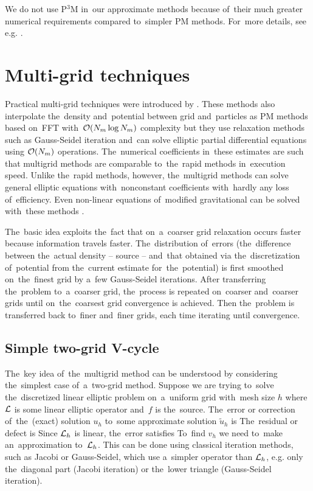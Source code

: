 We do not use P$^3$M in~our approximate methods because of~their much greater numerical requirements compared to~simpler PM methods. For~more details, see e.g. \textcite{Hockney:1988:CSU:62815}.
\section{Multi-grid techniques}
Practical multi-grid techniques were introduced by \textcite{10.2307/2006422}. These methods also interpolate the~density and~potential between grid and~particles as PM methods based on~FFT with~$\mathcal{O}(N_m\log N_m)$ complexity but they use relaxation methods such as Gauss-Seidel iteration \parencite{doi:10.1002/zamm.19720520813} and~can solve elliptic partial differential equations using $\mathcal{O}(N_m)$ operations. The~numerical coefficients in~these estimates are such that multigrid methods are comparable to~the~rapid methods in~execution speed. Unlike the~rapid methods, however, the~multigrid methods can solve general elliptic equations with~nonconstant coefficients with~hardly any loss of~efficiency. Even non-linear equations of~modified gravitational can be solved with~these methods \parencite{10.5555/42249}.

The~basic idea exploits the~fact that on~a~coarser grid relaxation occurs faster because information travels faster. The~distribution of~errors (the~difference between the~actual density -- source -- and~that obtained via the~discretization of~potential from the~current estimate for~the~potential) is first smoothed on~the~finest grid by a~few Gauss-Seidel iterations. After transferring the~problem to~a~coarser grid, the~process is repeated on~coarser and~coarser grids until on~the~coarsest grid convergence is achieved. Then the~problem is transferred back to~finer and~finer grids, each time iterating until convergence.
\subsection{Simple two-grid V-cycle}
The~key idea of~the~multigrid method can be understood by considering the~simplest case of~a~two-grid method. Suppose we are trying to~solve the~discretized linear elliptic problem on~a~uniform grid with~mesh size $h$
where $\mathcal{L}$ is some linear elliptic operator and~$f$ is the~source. The~error or correction of~the~(exact) solution $u_h$ to~some approximate solution $\tilde u_h$ is
The~residual or defect is
Since $\mathcal{L}_h$ is linear, the~error satisfies
To~find $v_h$ we need to~make an~approximation to~$\mathcal{L}_h$. This can be done using classical iteration methods, such as Jacobi or Gauss-Seidel, which use a~simpler operator than $\mathcal{L}_h$, e.g. only the~diagonal part (Jacobi iteration) or the~lower triangle (Gauss-Seidel iteration).

